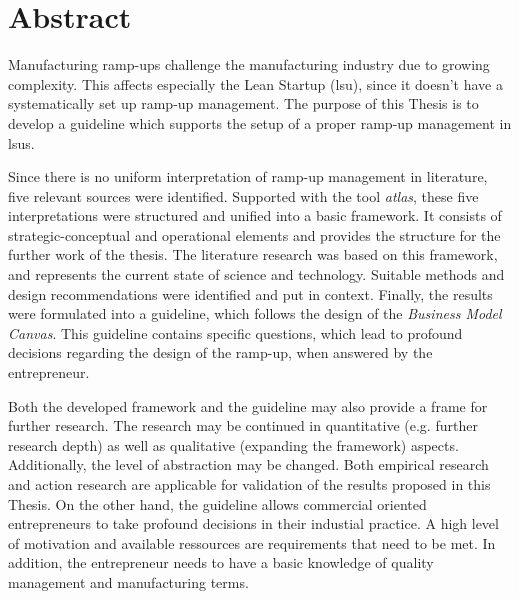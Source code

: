 \chapter*{Abstract}
Manufacturing ramp-ups challenge the manufacturing industry due to growing complexity. This affects especially the Lean Startup (\gls{lsu}), since it doesn't have a systematically set up ramp-up management. The purpose of this Thesis is to develop a guideline which supports the setup of a proper ramp-up management in \gls{lsu}s. 

Since there is no uniform interpretation of ramp-up management in literature, five relevant sources were identified. Supported with the tool \textit{\gls{atlas}}, these five interpretations were structured and unified into a basic framework. It consists of strategic-conceptual and operational elements and provides the structure for the further work of the thesis. The literature research was based on this framework, and represents the current state of science and technology. Suitable methods and design recommendations were identified and put in context. Finally, the results were formulated into a guideline, which follows the design of the \textit{Business Model Canvas}. This guideline contains specific questions, which lead to profound decisions regarding the design of the ramp-up, when answered by the entrepreneur. 

Both the developed framework and the guideline may also provide a frame for further research. %
The research may be continued in quantitative (e.g. further research depth) as well as qualitative (expanding the framework) aspects. Additionally, the level of abstraction may be changed. Both empirical research and action research are applicable for validation of the results proposed in this Thesis. 
On the other hand, the guideline allows commercial oriented entrepreneurs to take profound decisions in their industial practice. A high level of motivation and available ressources are requirements that need to be met. In addition, the entrepreneur needs to have a basic knowledge of quality management and manufacturing terms. 

